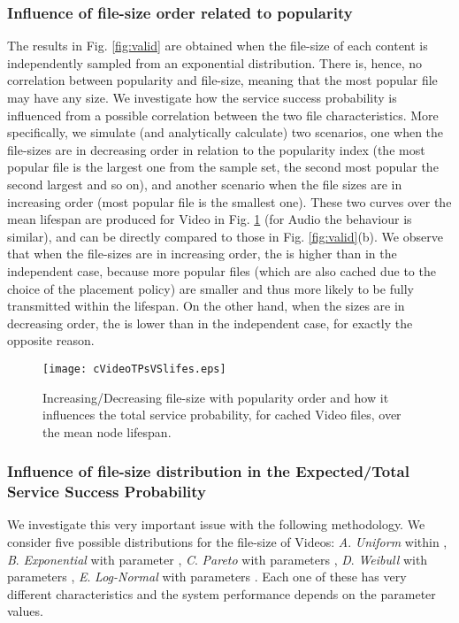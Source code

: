 \documentclass[conference]{IEEEtran}
\begin{document}
{\subsubsection{Influence of file-size order related to popularity}
The results in Fig. \ref{fig:valid} are obtained when the file-size of each content is independently sampled from an exponential distribution. There is, hence, no correlation between popularity and file-size, meaning that the most popular file may have any size. We investigate how the service success probability is influenced from a possible correlation between the two file characteristics. More specifically, we simulate (and analytically calculate) two scenarios, one when the file-sizes are in decreasing order in relation to the popularity index (the most popular file is the largest one from the sample set, the second most popular the second largest and so on), and another scenario when the file sizes are in increasing order (most popular file is the smallest one). These two curves over the mean lifespan are produced for Video in Fig. \ref{fig:Corr} (for Audio the behaviour is similar), and can be directly compared to those in Fig. \ref{fig:valid}(b). We observe that when the file-sizes are in increasing order, the  is higher than in the independent case, because more popular files (which are also cached due to the choice of the placement policy) are smaller and thus more likely to be fully transmitted within the lifespan. On the other hand, when the sizes are in decreasing order, the  is lower than in the independent case, for exactly the opposite reason.
\begin{figure}[ht!]
\centering
\texttt{[image: cVideoTPsVSlifes.eps]}
\caption{Increasing/Decreasing file-size with popularity order and how it influences the total service probability, for cached Video files, over the mean node lifespan.}
\label{fig:Corr}
\end{figure}


\subsubsection{Influence of file-size distribution in the Expected/Total Service Success Probability}
We investigate this very important issue with the following methodology. We consider five possible distributions for the file-size of Videos: \textit{A}. \textit{Uniform} within , \textit{B}. \textit{Exponential} with parameter , \textit{C}. \textit{Pareto} with parameters , \textit{D}. \textit{Weibull} with parameters , \textit{E}. \textit{Log-Normal} with parameters . Each one of these has very different characteristics and the system performance depends on the parameter values. 

}
\end{document}
